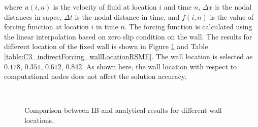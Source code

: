 where $u(i, n)$ is the velocity of fluid at location $i$ and time $n$, $\Delta x$ is the nodal distances in sapce, $\Delta t$ is the nodal distance in time, and $f(i,n)$ is the value of forcing function at location $i$ in time $n$. The forcing function is calculated using the linear interpolation based on zero slip condition on the wall. The results for different location of the fixed wall is shown in Figure \ref{fig:C3_indirectForcing_wallLocation} and Table \ref{table:C3_indirectForcing_wallLocationRSME}. The wall location is selected as $0.178$, $0.351$, $0.612$, $0.842$. As shown here, the wall location with respect to computational nodes does not affect the solution accuracy.

\begin{figure}[H]
	\centering
	\quad
	\\
	\quad
	\caption{Comparison between IB and analytical results for different wall locations.}
	\label{fig:C3_indirectForcing_wallLocation}
\end{figure}

